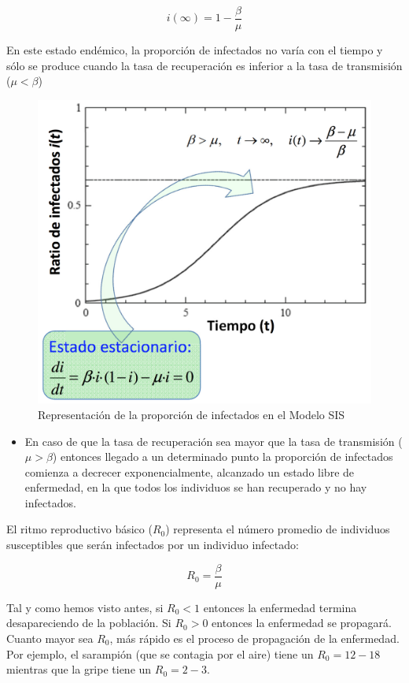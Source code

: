 \documentclass[]{article}
\begin{document}
\[i(\infty) = 1 - \frac{\beta}{\mu}\]

En este estado endémico, la proporción de infectados no varía con el
tiempo y sólo se produce cuando la tasa de recuperación es inferior a la
tasa de transmisión (\(\mu < \beta\))

\begin{figure}[htbp]
\centering
\includegraphics{../images/tema08/graficaSIS.png}
\caption{Representación de la proporción de infectados en el Modelo SIS}
\end{figure}

\begin{itemize}
\itemsep1pt\parskip0pt
\item
  En caso de que la tasa de recuperación sea mayor que la tasa de
  transmisión (\(\mu > \beta\)) entonces llegado a un determinado punto
  la proporción de infectados comienza a decrecer exponencialmente,
  alcanzado un estado libre de enfermedad, en la que todos los
  individuos se han recuperado y no hay infectados.
\end{itemize}

El ritmo reproductivo básico (\(R_0\)) representa el número promedio de
individuos susceptibles que serán infectados por un individuo infectado:

\[R_0 = \frac{\beta}{\mu}\]

Tal y como hemos visto antes, si \(R_0<1\) entonces la enfermedad
termina desapareciendo de la población. Si \(R_0>0\) entonces la
enfermedad se propagará. Cuanto mayor sea \(R_0\), más rápido es el
proceso de propagación de la enfermedad. Por ejemplo, el sarampión (que
se contagia por el aire) tiene un \(R_0= 12-18\) mientras que la gripe
tiene un \(R_0 = 2-3\).
\end{document}
